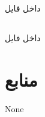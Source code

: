 \documentclass{article}
\begin{document}
\section{}
\subsection{}
داخل فایل 
\subsection{}
داخل فایل 


\section*{منابع}
\renewcommand{\section}[2]{}%
\begin{thebibliography}{99} %


\begin{LTRitems}

\resetlatinfont

 None
\end{LTRitems}

\end{thebibliography}
\end{document}
